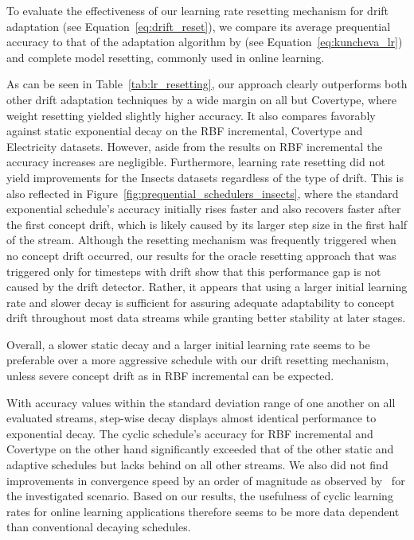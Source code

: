 \documentclass[letterpaper]{article} %
\begin{document}
To evaluate the effectiveness of our learning rate resetting mechanism for drift adaptation (see Equation~\eqref{eq:drift_reset}), we compare its average prequential accuracy to that of the adaptation algorithm by \citet{kunchevaAdaptiveLearningRate2008} (see Equation~\eqref{eq:kuncheva_lr}) and complete model resetting, commonly used in online learning.

As can be seen in Table~\ref{tab:lr_resetting}, our approach clearly outperforms both other drift adaptation techniques by a wide margin on all but Covertype, where weight resetting yielded slightly higher accuracy.
It also compares favorably against static exponential decay on the RBF incremental, Covertype and Electricity datasets.
However, aside from the results on RBF incremental the accuracy increases are negligible.
Furthermore, learning rate resetting did not yield improvements for the Insects datasets regardless of the type of drift.
This is also reflected in Figure~\ref{fig:prequential_schedulers_insects}, where the standard exponential schedule's accuracy initially rises faster and also recovers faster after the first concept drift, which is likely caused by its larger step size in the first half of the stream.
Although the resetting mechanism was frequently triggered when no concept drift occurred, our results for the oracle resetting approach that was triggered only for timesteps with drift show that this performance gap is not caused by the drift detector.
Rather, it appears that using a larger initial learning rate and slower decay is sufficient for assuring adequate adaptability to concept drift throughout most data streams while granting better stability at later stages.

Overall, a slower static decay and a larger initial learning rate seems to be preferable over a more aggressive schedule with our drift resetting mechanism, unless severe concept drift as in RBF incremental can be expected.

With accuracy values within the standard deviation range of one another on all evaluated streams, step-wise decay displays almost identical performance to exponential decay.
The cyclic schedule's accuracy for RBF incremental and Covertype on the other hand significantly exceeded that of the other static and adaptive schedules but lacks behind on all other streams.
We also did not find improvements in convergence speed by an order of magnitude as observed by~\cite{smithSuperConvergenceVeryFast2018a} for the investigated scenario.
Based on our results, the usefulness of cyclic learning rates for online learning applications therefore seems to be more data dependent than conventional decaying schedules.
\end{document}
